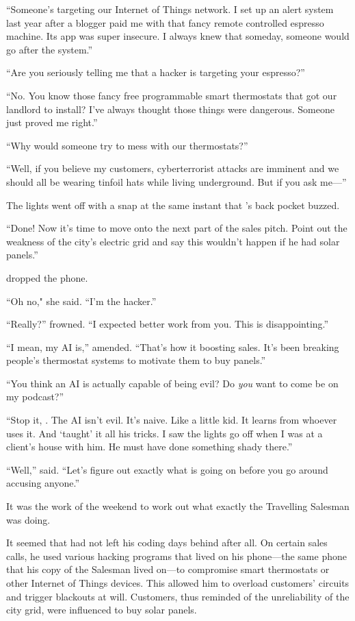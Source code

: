 ``Someone’s targeting our Internet of Things network. I set up an alert system last year after a blogger paid me with that fancy remote controlled espresso machine. Its app was super insecure. I always knew that someday, someone would go after the system.''

``Are you seriously telling me that a hacker is targeting your espresso?''

``No. You know those fancy free programmable smart thermostats that \crunchyCity{} got our landlord to install? I've always thought those things were dangerous. Someone just proved me right.''

``Why would someone try to mess with our thermostats?''

``Well, if you believe my customers, cyberterrorist attacks are imminent and we should all be wearing tinfoil hats while living underground. But if you ask me---''

The lights went off with a snap at the same instant that {\protag}'s back pocket buzzed.

``Done! Now it's time to move onto the next part of the sales pitch. Point out the weakness of the city’s electric grid and say this wouldn't happen if he had solar panels.''

{\protag} dropped the phone.

``Oh no," she said. ``I’m the hacker.''

``Really?'' {\sidetag} frowned. ``I expected better work from you. This is disappointing.''

``I mean, my AI is,'' {\protag} amended. ``That’s how it boosting sales. It's been breaking people’s thermostat systems to motivate them to buy panels.''

``You think an AI is actually capable of being evil? Do \emph{you} want to come be on my podcast?''

``Stop it, {\sidetag}. The AI isn't evil. It's naive. Like a little kid. It learns from whoever uses it. And \energyJerk{} `taught' it all his tricks. I saw the lights go off when I was at a client's house with him. He must have done something shady there.''

``Well,” {\sidetag} said. ``Let's figure out exactly what is going on before you go around accusing anyone.''

It was the work of the weekend to work out what exactly the Travelling Salesman was doing.

It seemed that \energyJerk{} had not left his coding days behind after all. On certain sales calls, he used various hacking programs that lived on his phone---the same phone that his copy of the Salesman lived on---to compromise smart thermostats or other Internet of Things devices. This allowed him to overload customers' circuits and trigger blackouts at will. Customers, thus reminded of the unreliability of the city grid, were influenced to buy solar panels.

